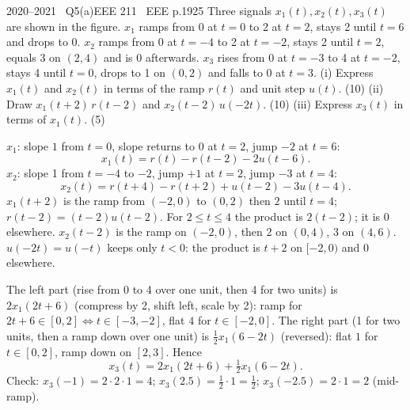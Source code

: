 \begin{qcard}{2020--2021 \textbullet\ Q5(a)}{EEE 211 \textbullet\ EEE p.19}{25}
Three signals $x_1(t),x_2(t),x_3(t)$ are shown in the figure. $x_1$ ramps from 0 at $t=0$ to 2 at $t=2$, stays 2 until $t=6$ and drops to 0. $x_2$ ramps from 0 at $t=-4$ to 2 at $t=-2$, stays 2 until $t=2$, equals 3 on $(2,4)$ and is 0 afterwards. $x_3$ rises from 0 at $t=-3$ to 4 at $t=-2$, stays 4 until $t=0$, drops to 1 on $(0,2)$ and falls to 0 at $t=3$.
(i) Express $x_1(t)$ and $x_2(t)$ in terms of the ramp $r(t)$ and unit step $u(t)$. (10) \quad (ii) Draw $x_1(t+2)\,r(t-2)$ and $x_2(t-2)\,u(-2t)$. (10) \quad (iii) Express $x_3(t)$ in terms of $x_1(t)$. (5)
\end{qcard}
\begin{solution}
 $x_1$: slope $1$ from $t=0$, slope returns to $0$ at $t=2$, jump $-2$ at $t=6$:
\[x_1(t)=r(t)-r(t-2)-2u(t-6).\]
$x_2$: slope 1 from $t=-4$ to $-2$, jump $+1$ at $t=2$, jump $-3$ at $t=4$:
\[x_2(t)=r(t+4)-r(t+2)+u(t-2)-3u(t-4).\]
 $x_1(t+2)$ is the ramp from $(-2,0)$ to $(0,2)$ then $2$ until $t=4$; $r(t-2)=(t-2)u(t-2)$. For $2\le t\le4$ the product is $2(t-2)$; it is 0 elsewhere.
$x_2(t-2)$ is the ramp on $(-2,0)$, then 2 on $(0,4)$, 3 on $(4,6)$. $u(-2t)=u(-t)$ keeps only $t<0$: the product is $t+2$ on $[-2,0)$ and $0$ elsewhere.
\begin{center}
\hspace{4mm}
\end{center}
 The left part (rise from 0 to 4 over one unit, then 4 for two units) is $2x_1(2t+6)$ (compress by 2, shift left, scale by 2): ramp for $2t+6\in[0,2]\Leftrightarrow t\in[-3,-2]$, flat $4$ for $t\in[-2,0]$. The right part (1 for two units, then a ramp down over one unit) is $\frac12x_1(6-2t)$ (reversed): flat $1$ for $t\in[0,2]$, ramp down on $[2,3]$. Hence
\[x_3(t)=2x_1(2t+6)+\tfrac12x_1(6-2t).\]
Check: $x_3(-1)=2\cdot2\cdot1\!=\!4$; $x_3(2.5)=\frac12\cdot1=\frac12$; $x_3(-2.5)=2\cdot1=2$ (mid-ramp).
\end{solution}

